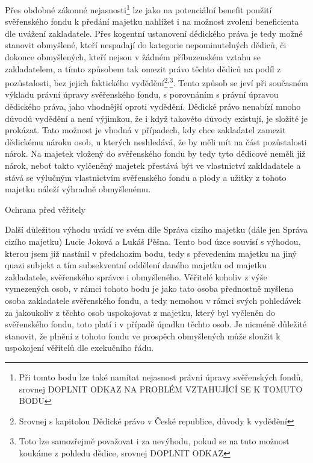 \documentclass{article}
\begin{document}
 Přes obdobné zákonné nejasnosti\footnote{Při tomto bodu lze také namítat nejasnost právní úpravy svěřenských fondů, srovnej DOPLNIT ODKAZ NA PROBLÉM VZTAHUJÍCÍ SE K TOMUTO BODU} lze jako na potenciální benefit použití svěřen\-ského fondu k předání majetku nahlížet i na možnost zvolení beneficienta dle uvážení zakladatele. Přes kogentní ustanovení dědického práva je tedy možné stanovit obmyšlené, kteří nespadají do kategorie nepominutelných dědiců, či dokonce obmyšlených, kteří nejsou v žádném příbuzenském vztahu se zakladatelem, a tímto způsobem tak omezit právo těchto dědiců na podíl z pozůstalosti, bez jejich faktického vydědění\footnote{Srovnej s kapitolou Dědické právo v České republice, důvody k vydědění}\textsuperscript{,}\footnote{Toto lze samozřejmě považovat i za nevýhodu, pokud se na tuto možnost koukáme z pohledu dědice, srovnej DOPLNIT ODKAZ}. Tento způsob se jeví při současném výkladu právní úpravy svěřenského fondu, s porovnáním s právní úpravou dědického práva, jaho vhodnější oproti vydědění. Dědické právo nenabízí mnoho důvodů vydědění a není výjimkou, že i když takovéto důvody existují, je složité je prokázat. Tato možnost je vhodná v případech, kdy chce zakladatel zamezit dědickému nároku osob, u kterých neshledává, že by měli mít na část pozůstalosti nárok. Na majetek vložený do svěřenského fondu by tedy tyto dědicové neměli již nárok, neboť takto vylčeněný majetek přestává být ve vlastnictví zakldadatele a stává se výlučným vlastnictvím svěřenského fondu a plody a užitky z tohoto majetku náleží výhradně obmyšlenému.
 
 
 \newpage
 \thispagestyle{smallertextinheader}
  \begin{enumerate}
 {\Large\item[2.] Ochrana před věřitely}
 \end{enumerate}
 
 Další důležitou výhodu uvádí ve svém díle Správa cizího majetku (dále jen Správa cizího majetku) Lucie Joková a Lukáš Pěšna. Tento bod úzce souvisí s výhodou, kterou jsem již nastínil v předchozím bodu, tedy s převedením majetku na jiný quazi subjekt a tím subsekventní oddělení daného majetku od majetku zakladatele, svěřenského správce i obmyšleného. Věřitelé koholiv z výše vymezených osob, v rámci tohoto bodu je jako tato osoba přednostně myšlena osoba zakladatele svěřenského fondu, a tedy nemohou v rámci svých pohledávek za jakoukoliv z těchto osob uspokojovat z majetku, který byl vyčleněn do svěřenského fondu, toto platí i v případě úpadku těchto osob. Je nicméně důležité stanovit, že plnění z tohoto fondu ve prospěch obmyšlených může sloužit k uspokojení věřitelů dle exekučního řádu.\\
 
\end{document}
